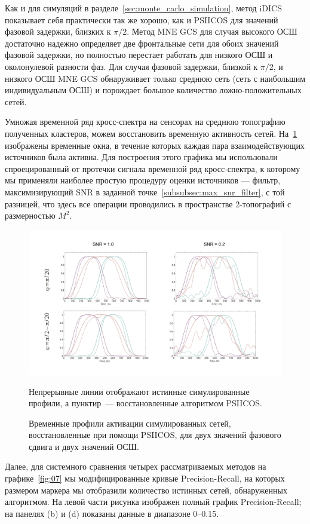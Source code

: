 Как и для симуляций в разделе~\ref{sec:monte_carlo_simulation}, метод iDICS показывает себя
практически так же хорошо, как и PSIICOS для значений фазовой задержки, близких к $\pi/2$.
Метод MNE GCS для случая высокого ОСШ достаточно надежно определяет две фронтальные сети для
обоих значений фазовой задержки, но полностью перестает работать для низкого ОСШ и
околонулевой разности фаз. Для случая фазовой задержки, близкой к $\pi/2$, и низкого ОСШ
MNE GCS обнаруживает только среднюю сеть (сеть с наибольшим индивидуальным ОСШ) и
порождает большое количество ложно-положительных сетей.

Умножая временной ряд кросс-спектра на сенсорах на среднюю топографию
полученных кластеров, можем восстановить временную активность сетей.
На~\ref{fig:06} изображены временные окна, в течение которых каждая пара
взаимодействующих источников была активна.  Для построения этого графика мы
использовали спроецированный от протечки сигнала временной ряд кросс-спектра,
к которому мы применяли наиболее простую процедуру оценки источников ---
фильтр, максимизирующий SNR в заданной точке~\ref{subsubsec:max_snr_filter}, с
той разницей, что здесь все операции проводились в пространстве 2-топографий с
размерностью $M^2$.

\begin{figure}[!ht]
    \includegraphics[width=1\textwidth]{../images/psiicos_paper/Figure6_hr.jpg}
    \caption{Временные профили активации симулированных сетей, восстановленные при помощи PSIICOS, для двух
        значений фазового сдвига и двух значений ОСШ.}\label{fig:06} %
        Непрерывные линии отображают истинные симулированные профили, а
        пунктир~--- восстановленные алгоритмом PSIICOS.\@
\end{figure}%

Далее, для системного сравнения четырех рассматриваемых методов на графике~\ref{fig:07}
мы модифицированные кривые Precision-Recall, на которых размером маркера мы отобразили
количество истинных сетей, обнаруженных алгоритмом. На левой части рисунка изображен
полный график Precision-Recall; на панелях (b) и (d) показаны данные в диапазоне 0--0.15.

